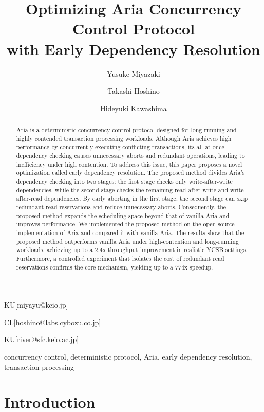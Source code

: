 \documentclass[english,preprint,JIP]{ipsj}
\begin{document}
\title{Optimizing Aria Concurrency Control Protocol\\with Early Dependency Resolution}


\author{Yusuke Miyazaki}{KU}[miyayu@keio.jp]
\author{Takashi Hoshino}{CL}[hoshino@labs.cybozu.co.jp]
\author{Hideyuki Kawashima}{KU}[river@sfc.keio.ac.jp]


\begin{abstract}
Aria is a deterministic concurrency control protocol designed for long-running and highly contended transaction processing workloads.
Although Aria achieves high performance by concurrently executing conflicting transactions, its all-at-once dependency checking causes unnecessary aborts and redundant operations, leading to inefficiency under high contention.
To address this issue, this paper proposes a novel optimization called early dependency resolution.
The proposed method divides Aria's dependency checking into two stages: the first stage checks only write-after-write dependencies, while the second stage checks the remaining read-after-write and write-after-read dependencies.
By early aborting in the first stage, the second stage can skip redundant read reservations and reduce unnecessary aborts.
Consequently, the proposed method expands the scheduling space beyond that of vanilla Aria and improves performance.
We implemented the proposed method on the open-source implementation of Aria and compared it with vanilla Aria.
The results show that the proposed method outperforms vanilla Aria under high-contention and long-running workloads, achieving up to a 2.4x throughput improvement in realistic YCSB settings.
Furthermore, a controlled experiment that isolates the cost of redundant read reservations confirms the core mechanism, yielding up to a 774x speedup.
\end{abstract}

\begin{keyword}
concurrency control, deterministic protocol, Aria, early dependency resolution, transaction processing
\end{keyword}

\maketitle

\section{Introduction}
\end{document}
